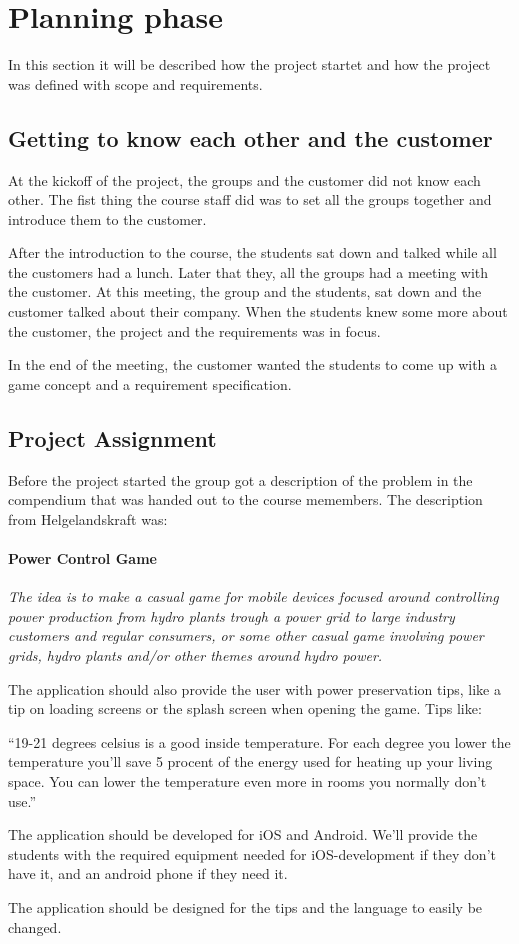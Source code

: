 \section{Planning phase}
	In this section it will be described how the project startet
	and how the project was defined with scope and requirements.

\subsection{Getting to know each other and the customer}
	At the kickoff of the project, the groups and the customer did not know 
	each other. The fist thing the course staff did was to set all the groups
	together and introduce them to the customer. 

	After the introduction to the course, the students sat down and talked while
	all the customers had a lunch. Later that they, all the groups had a meeting 
	with the customer. At this meeting, the group and the students, sat down and 
	the customer talked about their company. When the students knew some more about
	the customer, the project and the requirements was in focus. 

	In the end of the meeting, the customer wanted the students to come up
	with a game concept and a requirement specification. 
	

\subsection{Project Assignment}
	Before the project started the group got a description of the problem
	in the compendium that was handed out to the course memembers. The 
	description from Helgelandskraft was: 
		\paragraph{Power Control Game}
		{\it The idea is to make a casual game for mobile devices focused around controlling 
		power production from hydro plants trough a power grid to large industry customers and 
		regular consumers, or some other casual game involving power grids, hydro plants 
		and/or other themes around hydro power. 
		 
		The application should also provide the user with power preservation tips, like a 
		tip on loading screens or the splash screen when opening the game. Tips like: 
		 
		“19-21 degrees celsius is a good inside temperature. For each degree you lower the temperature 
		you’ll save 5 procent of the energy used for heating up your living space. 
		You can lower the temperature even more in rooms you normally don’t use.” 
		 
		The application should be developed for iOS and Android. We’ll provide the 
		students with the required equipment needed for iOS-development if they don’t 
		have it, and an android phone if they need it. 
		 
		The application should be designed for the tips and the language to easily be changed.}


